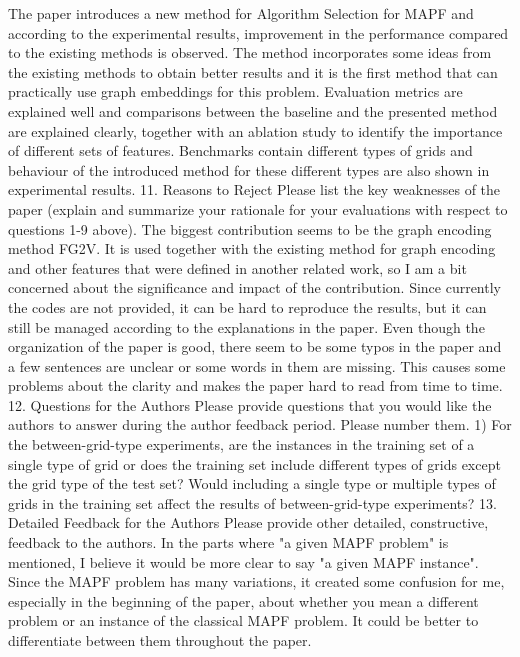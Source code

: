 The paper introduces a new method for Algorithm Selection for MAPF and according to the experimental results, improvement in the performance compared to the existing methods is observed. The method incorporates some ideas from the existing methods to obtain better results and it is the first method that can practically use graph embeddings for this problem. Evaluation metrics are explained well and comparisons between the baseline and the presented method are explained clearly, together with an ablation study to identify the importance of different sets of features. Benchmarks contain different types of grids and behaviour of the introduced method for these different types are also shown in experimental results.
11. {Reasons to Reject} Please list the key weaknesses of the paper (explain and summarize your rationale for your evaluations with respect to questions 1-9 above).
The biggest contribution seems to be the graph encoding method FG2V. It is used together with the existing method for graph encoding and other features that were defined in another related work, so I am a bit concerned about the significance and impact of the contribution. Since currently the codes are not provided, it can be hard to reproduce the results, but it can still be managed according to the explanations in the paper. Even though the organization of the paper is good, there seem to be some typos in the paper and a few sentences are unclear or some words in them are missing. This causes some problems about the clarity and makes the paper hard to read from time to time.
12. {Questions for the Authors} Please provide questions that you would like the authors to answer during the author feedback period. Please number them.
1) For the between-grid-type experiments, are the instances in the training set of a single type of grid or does the training set include different types of grids except the grid type of the test set? Would including a single type or multiple types of grids in the training set affect the results of between-grid-type experiments?
13. {Detailed Feedback for the Authors} Please provide other detailed, constructive, feedback to the authors.
In the parts where "a given MAPF problem" is mentioned, I believe it would be more clear to say "a given MAPF instance". Since the MAPF problem has many variations, it created some confusion for me, especially in the beginning of the paper, about whether you mean a different problem or an instance of the classical MAPF problem. It could be better to differentiate between them throughout the paper.


